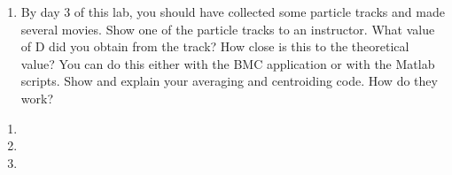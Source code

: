 \documentclass{../signatures}
\begin{document}

\begin{enumerate}

\item By day 3 of this lab, you should have collected some particle tracks and made several movies. Show one of the particle tracks to an instructor. What value of D did you obtain from the track? How close is this to the theoretical value? You can do this either with the BMC application or with the Matlab scripts. Show and explain your averaging and centroiding code. How do they work? 
\\[36pt]
\end{enumerate}


\checkpointsection 

\begin{enumerate}

\item {}

\item {}

\item {}

\end{enumerate}
\end{document}
